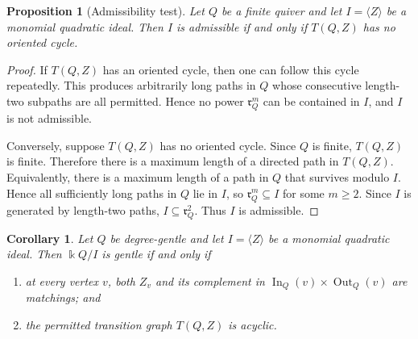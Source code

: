 \documentclass[11pt]{article}
\newcommand{\K}{\Bbbk}
\newcommand{\rad}{\mathfrak r}
\newcommand{\In}{\operatorname{In}}
\newcommand{\Out}{\operatorname{Out}}
\theoremstyle{plain}
\newtheorem{proposition}[theorem]{Proposition}
\newtheorem{corollary}[theorem]{Corollary}
\theoremstyle{definition}
\theoremstyle{remark}
\begin{document}
\begin{proposition}[Admissibility test]\label{prop:admissibility}
Let \(Q\) be a finite quiver and let \(I=\langle Z\rangle\) be a monomial
quadratic ideal.  Then \(I\) is admissible if and only if \(T(Q,Z)\) has no
oriented cycle.
\end{proposition}

\begin{proof}
If \(T(Q,Z)\) has an oriented cycle, then one can follow this cycle repeatedly.
This produces arbitrarily long paths in \(Q\) whose consecutive length-two
subpaths are all permitted.  Hence no power \(\rad_Q^m\) can be contained in
\(I\), and \(I\) is not admissible.

Conversely, suppose \(T(Q,Z)\) has no oriented cycle.  Since \(Q\) is finite,
\(T(Q,Z)\) is finite.  Therefore there is a maximum length of a directed path in
\(T(Q,Z)\).  Equivalently, there is a maximum length of a path in \(Q\) that
survives modulo \(I\).  Hence all sufficiently long paths in \(Q\) lie in \(I\),
so \(\rad_Q^m\subseteq I\) for some \(m\geq 2\).  Since \(I\) is generated by
length-two paths, \(I\subseteq \rad_Q^2\).  Thus \(I\) is admissible.
\end{proof}

\begin{corollary}\label{cor:gentlecriterion}
Let \(Q\) be degree-gentle and let \(I=\langle Z\rangle\) be a monomial
quadratic ideal.  Then \(\K Q/I\) is gentle if and only if
\begin{enumerate}[label=(\roman*),leftmargin=2em]
  \item at every vertex \(v\), both \(Z_v\) and its complement in
  \(\In_Q(v)\times \Out_Q(v)\) are matchings; and
  \item the permitted transition graph \(T(Q,Z)\) is acyclic.
\end{enumerate}
\end{corollary}
\end{document}
